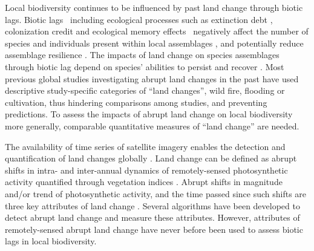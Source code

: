 Local biodiversity continues to be influenced by past land change through biotic lags. Biotic lags \textendash\ including ecological processes such as extinction debt \citep{Tilman1994,Kuussaari2009,Halley2016}, colonization credit \citep{Hylander2013} and ecological memory effects \citep{Ogle2015} \textendash\ negatively affect the number of species and individuals present within local assemblages \citep{Halley2016,Jung2018,Perring2018}, and potentially reduce assemblage resilience \citep{Oliver2015,Hautier2015,Nimmo2015}. The impacts of land change on species assemblages through biotic lag depend on species’ abilities to persist \citep{Turner1998} and recover \citep{Martin2013,Fu2017,Moreno-Mateos2017}. Most previous global studies \citep{Supp2014,Fu2017,Moreno-Mateos2017,Shackelford2017} investigating abrupt land changes in the past have used descriptive study-specific categories of “land changes”, \eg wild fire, flooding or cultivation, thus hindering comparisons among studies, and preventing predictions. To assess the impacts of abrupt land change on local biodiversity more generally, comparable quantitative measures of “land change” are needed.

The availability of time series of satellite imagery enables the detection and quantification of land changes globally \citep{Kennedy2014,Song2018}. Land change can be defined as abrupt shifts in intra- and inter-annual dynamics of remotely-sensed photosynthetic activity quantified through vegetation indices \citep{Linderman2005,Pettorelli2005}. Abrupt shifts in magnitude \citep{Kennedy2012,Watson2014,DeVries2015b} and/or trend \citep{dejong2013} of photosynthetic activity, and the time passed since such shifts \citep{POTTER2003,Kennedy2012} are three key attributes of land change \citep{Watson2014}. Several algorithms have been developed to detect abrupt land change \citep{Zhu2017} and measure these attributes. However, attributes of remotely-sensed abrupt land change have never before been used to assess biotic lags in local biodiversity.

